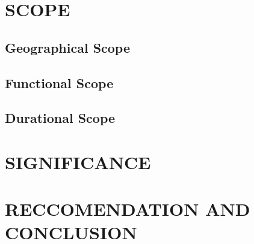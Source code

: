 \documentclass[11pt]{report}
\begin{document}
\section{SCOPE}
\subsection{Geographical Scope}


\subsection{Functional Scope}


\subsection{Durational Scope}


\section{SIGNIFICANCE}


\section{RECCOMENDATION AND CONCLUSION}
\end{document}
